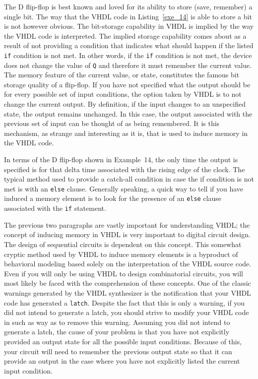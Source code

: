 The D flip-flop is best known and loved for its ability to store (save, remember) a single bit. The way that the VHDL code in Listing~\ref{exe_14} is able to store a bit is not however obvious. The bit-storage capability in VHDL is implied by the way the VHDL code is interpreted. The implied storage capability comes about as a result of not providing a condition that indicates what should happen if the listed \texttt{if} condition is not met. In other words, if the \texttt{if} condition is not met, the device does not change the value of \texttt{Q} and therefore it must remember the current value. The memory feature of the current value, or state, constitutes the famous bit storage quality of a flip-flop. If you have not specified what the output should be for every possible set of input conditions, the option taken by VHDL is to not change the current output. By definition, if the input changes to an unspecified state, the output remains unchanged. In this case, the output associated with the previous set of input can be thought of as being remembered. It is this mechanism, as strange and interesting as it is, that is used to induce memory in the VHDL code. 

In terms of the D flip-flop shown in Example~14, the only time the output is specified is for that delta time associated with the rising edge of the clock. The typical method used to provide a catch-all condition in case the if condition is not met is with an \texttt{else} clause. Generally speaking, a quick way to tell if you have induced a memory element is to look for the presence of an \texttt{else} clause associated with the \texttt{if} statement. 

The previous two paragraphs are vastly important for understanding VHDL; the concept of inducing memory in VHDL is very important to digital circuit design. The design of sequential circuits is dependent on this concept. This somewhat cryptic method used by VHDL to induce memory elements is a byproduct of behavioral modeling based solely on the interpretation of the VHDL source code. Even if you will only be using VHDL to design combinatorial circuits, you will most likely be faced with the comprehension of these concepts. One of the classic warnings generated by the VHDL synthesizer is the notification that your VHDL code has generated a \texttt{latch}. Despite the fact that this is only a warning, if you did not intend to generate a latch, you should strive to modify your VHDL code in such as way as to remove this warning. Assuming you did not intend to generate a latch, the cause of your problem is that you have not explicitly provided an output state for all the possible input conditions. Because of this, your circuit will need to remember the previous output state so that it can provide an output in the case where you have not explicitly listed the current input condition. 

